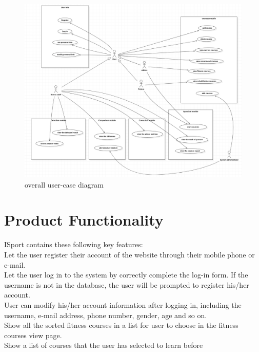 \documentclass[16pt]{scrreprt}
\begin{document}
\begin{figure}[H]
    \centering
    \includegraphics[width=1.0\textwidth]{figures/big-user-case.png}
    \caption{overall user-case diagram}
\end{figure}



\section{Product Functionality}

ISport contains these following key features:\\
Let the user register their account of the website through their mobile phone or e-mail.\\

 
Let the user log in to the system by correctly complete the log-in form. If the username is not in the database, the user will be prompted to register his/her account.\\

 
User can modify his/her account information after logging in, including the username, e-mail address, phone number, gender, age and so on.\\

 
Show all the sorted fitness courses in a list for user to choose in the fitness courses view page. \\

 
Show a list of courses that the user has selected to learn before\\
\end{document}
